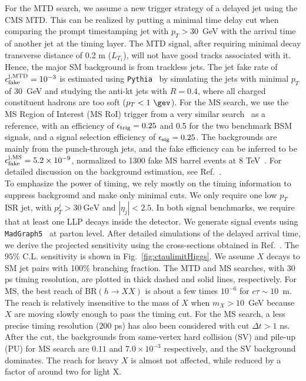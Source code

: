 For the MTD search, we assume a new trigger strategy of a delayed jet using the CMS MTD.
This can be realized by putting a minimal time delay cut when comparing the prompt timestamping jet with $p_T > 30$~GeV with the arrival time of another jet at the timing layer. 
The MTD signal, after requiring minimal decay transverse distance of 0.2 m ($L_{T_1}$), will not 
have good tracks associated with it. Hence, the major SM background is from trackless jets.
The jet fake rate of $\epsilon_{\rm fake}^{\rm j, MTD} = 10^{-3}$ is estimated
using {\tt Pythia}~\cite{Sjostrand:2007gs} by simulating the jets with minimal $p_T$ of 30~GeV and studying the anti-kt jets with $R=0.4$, where all charged constituent hadrons are too soft ($p_T<1~\gev$). 
For the MS search, we use the MS Region 
of Interest (MS RoI) trigger from a very similar search~\cite{Aaboud:2017iio} as a reference, with an efficiency 
of $\epsilon_{\rm trig}=0.25$ and 0.5 for the two benchmark BSM signals, and a signal selection efficiency of 
$\epsilon_{\rm sig}=0.25$. The backgrounds are mainly from the punch-through jets, and the  fake efficiency can be inferred 
to be $\epsilon_{\rm fake}^{\rm j, MS} = 5.2 \times 10^{-9}$, normalized to 1300 fake MS barrel events at 8 TeV~\cite{Aaboud:2017iio}.
For detailed discussion on the background estimation, see Ref.~\cite{Liu:2018wte}.
\\

To emphasize the power of timing, we rely mostly on the timing information to suppress background and make only 
minimal cuts. We only require one low $p_T$ ISR jet, with $p_T^j > 30~\text{GeV}$ and $|\eta_j| < 2.5$.
In both signal benchmarks, we require that at least one LLP decays inside the detector. We generate signal events using {\tt MadGraph5}~\cite{Alwall:2014hca} at parton level. 
After detailed simulations of the delayed arrival time, we derive the projected sensitivity using the 
cross-sections obtained in Ref.~\cite{Greiner:2015jha}. The $95\%$ C.L. sensitivity is shown in Fig.~\ref{fig:ctaulimitHiggs}. 
We assume $X$ decays to SM jet pairs with 100\% branching fraction.
The MTD and MS searches, with $30$ ps timing resolution, are plotted in thick dashed and solid lines, respectively. 
For MS, the best reach of $\text{BR}(h\to XX)$ is about a few times $10^{-6}$ for $c \tau \sim 10$~m. 
The reach is relatively insensitive to the mass of $X$ when $m_X> 10$~GeV because $X$ are moving slowly enough
to pass the timing cut. 
For the MS search, a less precise timing resolution 
($200$ ps) has also been considered with cut $\Delta t > 1$ ns. After the cut, the backgrounds from same-vertex hard collision (SV) and pile-up (PU) for MS search are $0.11$ and $7.0 \times 10^{-3}$ respectively, and the SV background dominates.  
The reach for heavy $X$ is almost not affected, 
while reduced by a factor of around two for light X.

